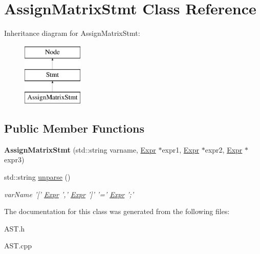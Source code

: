 \hypertarget{classAssignMatrixStmt}{\section{Assign\-Matrix\-Stmt Class Reference}
\label{classAssignMatrixStmt}
}
Inheritance diagram for Assign\-Matrix\-Stmt\-:\begin{figure}[H]
\begin{center}
\leavevmode
\includegraphics[height=3.000000cm]{classAssignMatrixStmt}
\end{center}
\end{figure}
\subsection*{Public Member Functions}
\begin{DoxyCompactItemize}
\item 
\hypertarget{classAssignMatrixStmt_a465fd08a319086eb9a0d3b2fae446737}{{\bfseries Assign\-Matrix\-Stmt} (std\-::string varname, \hyperlink{classExpr}{Expr} $\ast$expr1, \hyperlink{classExpr}{Expr} $\ast$expr2, \hyperlink{classExpr}{Expr} $\ast$expr3)}\label{classAssignMatrixStmt_a465fd08a319086eb9a0d3b2fae446737}

\item 
\hypertarget{classAssignMatrixStmt_a53bed2ad37d9413bcb3c8f34f73a3323}{std\-::string \hyperlink{classAssignMatrixStmt_a53bed2ad37d9413bcb3c8f34f73a3323}{unparse} ()}\label{classAssignMatrixStmt_a53bed2ad37d9413bcb3c8f34f73a3323}

\begin{DoxyCompactList}\small\item\em var\-Name '\mbox{[}' \hyperlink{classExpr}{Expr} ',' \hyperlink{classExpr}{Expr} '\mbox{]}' '=' \hyperlink{classExpr}{Expr} ';' \end{DoxyCompactList}\end{DoxyCompactItemize}


The documentation for this class was generated from the following files\-:\begin{DoxyCompactItemize}
\item 
A\-S\-T.\-h\item 
A\-S\-T.\-cpp\end{DoxyCompactItemize}
